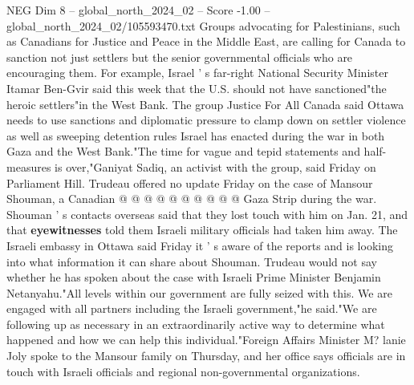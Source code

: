 \begin{textsample}{NEG Dim 8 – global\_north\_2024\_02 – Score -1.00 – global\_north\_2024\_02/105593470.txt}
Groups advocating for Palestinians, such as Canadians for Justice and Peace in the Middle East, are calling for Canada to sanction not just settlers but the senior governmental officials who are encouraging them.
For example, Israel ' s far-right National Security Minister Itamar Ben-Gvir said this week that the U.S. should not have sanctioned"the heroic settlers"in the West Bank.
The group Justice For All Canada said Ottawa needs to use sanctions and diplomatic pressure to clamp down on settler violence as well as sweeping detention rules Israel has enacted during the war in both Gaza and the West Bank."The time for vague and tepid statements and half-measures is over,"Ganiyat Sadiq, an activist with the group, said Friday on Parliament Hill.
Trudeau offered no update Friday on the case of Mansour Shouman, a Canadian @ @ @ @ @ @ @ @ @ @ Gaza Strip during the war.
Shouman ' s contacts overseas said that they lost touch with him on Jan. 21, and that \textbf{eyewitnesses} told them Israeli military officials had taken him away.
The Israeli embassy in Ottawa said Friday it ' s aware of the reports and is looking into what information it can share about Shouman.
Trudeau would not say whether he has spoken about the case with Israeli Prime Minister Benjamin Netanyahu."All levels within our government are fully seized with this.
We are engaged with all partners including the Israeli government,"he said."We are following up as necessary in an extraordinarily active way to determine what happened and how we can help this individual."Foreign Affairs Minister M? lanie Joly spoke to the Mansour family on Thursday, and her office says officials are in touch with Israeli officials and regional non-governmental organizations.

\end{textsample}
